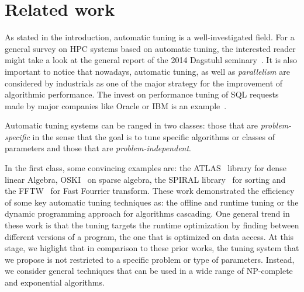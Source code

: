 \documentclass[10pt, conference, compsocconf]{IEEEtran}
\begin{document}
\section{Related work} \label{Related}

As stated in the introduction, automatic tuning  is a well-investigated field. For a general survey on HPC systems based on 
automatic tuning, the interested reader might take a look at the general report of the 2014 Dagstuhl seminary~\cite{benkner_et_al:DR:2014:4423}. 
It is also important to notice that nowadays, automatic tuning, as well as  {\it parallelism} are considered by industrials as one of the 
major strategy for the improvement of algorithmic performance. The invest on performance tuning of SQL requests made by major companies  
like Oracle or IBM is an example~\cite{Oracle}. 

Automatic tuning systems can be ranged in two classes: those that are {\it problem-specific} in the sense that the goal is to tune 
specific algorithms or classes of parameters and those that are {\it problem-independent}. 

In the first class, some convincing examples are: the ATLAS~\cite{ATLAS} library for dense linear Algebra, 
OSKI~\cite{Vuduc:2005zi} on sparse algebra,  the SPIRAL library~\cite{Spiral} for sorting and the FFTW~\cite{FFTW}  
for Fast Fourrier transform. These work demonstrated the efficiency of some key automatic tuning techniques as: the offline and  
 runtime tuning or the dynamic programming approach for algorithms cascading. One general trend in these work is that 
the tuning targets the runtime optimization by finding between different versions of a program, the one that is optimized on data 
access. At this stage, we higlight that in comparison to these prior works, the tuning system that we propose is not restricted to 
a specific problem or type of parameters. Instead, we consider general 
techniques that can be used in a wide range of NP-complete and exponential algorithms.
\end{document}
